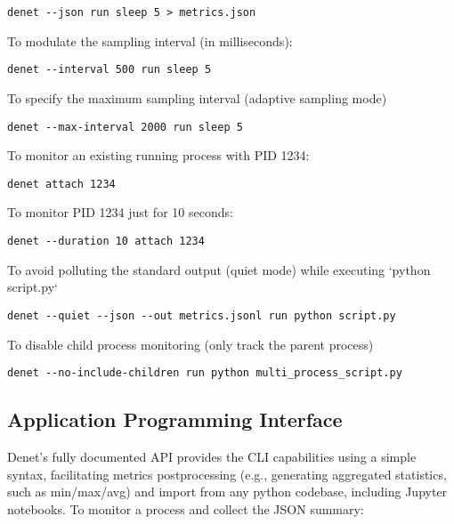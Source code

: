 \documentclass[10pt]{article}
\begin{document}
\begin{verbatim}
denet --json run sleep 5 > metrics.json
\end{verbatim}

\noindent To modulate the sampling interval (in milliseconds):

\begin{verbatim}
denet --interval 500 run sleep 5
\end{verbatim}

\noindent To specify the maximum sampling interval (adaptive sampling mode)

\begin{verbatim}
denet --max-interval 2000 run sleep 5
\end{verbatim}

\noindent To monitor an existing running process with PID 1234:

\begin{verbatim}
denet attach 1234
\end{verbatim}

\noindent To monitor PID 1234 just for 10 seconds:

\begin{verbatim}
denet --duration 10 attach 1234
\end{verbatim}

\noindent To avoid polluting the standard output (quiet mode) while executing `python script.py`

\begin{verbatim}
denet --quiet --json --out metrics.jsonl run python script.py
\end{verbatim}

\noindent To disable child process monitoring (only track the parent process)

\begin{verbatim}
denet --no-include-children run python multi_process_script.py
\end{verbatim}


\subsection{Application Programming Interface}

Denet’s fully documented API provides the CLI capabilities using a simple syntax, facilitating metrics postprocessing (e.g., generating aggregated statistics, such as min/max/avg) and import from any python codebase, including Jupyter notebooks. To monitor a process and collect the JSON summary:
\end{document}
